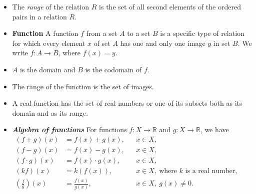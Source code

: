 \documentclass[11pt]{article}
\begin{document}
\begin{mdframed}
\begin{itemize}[label=$\diamond$]
\item The \textit{range} of the relation $R$ is the set of all second elements of
the ordered pairs in a relation $R$.

\item \textbf{Function}  
A function $f$ from a set $A$ to a set $B$ is a specific type of relation for which
every element $x$ of set $A$ has one and only one image $y$ in set $B$.  
We write $f : A \to B$, where $f(x) = y$.

\item $A$ is the domain and $B$ is the codomain of $f$.

\item The range of the function is the set of images.

\item A real function has the set of real numbers or one of its subsets both as
its domain and as its range.

\item \textbf{\textit{Algebra of functions}}  
For functions $f : X \to \mathbb{R}$ and $g : X \to \mathbb{R}$, we have
$\begin{aligned}
(f+g)(x) &= f(x) + g(x), && x \in X,\\
(f-g)(x) &= f(x) - g(x), && x \in X,\\
(f\cdot g)(x) &= f(x)\cdot g(x), && x \in X,\\
(kf)(x) &= k(f(x)), && x \in X,\ \text{where } k \text{ is a real number},\\
\left(\frac{f}{g}\right)(x) &= \frac{f(x)}{g(x)}, && x \in X,\ g(x) \neq 0.
\end{aligned}$
\end{itemize}

\end{mdframed}
\end{document}
